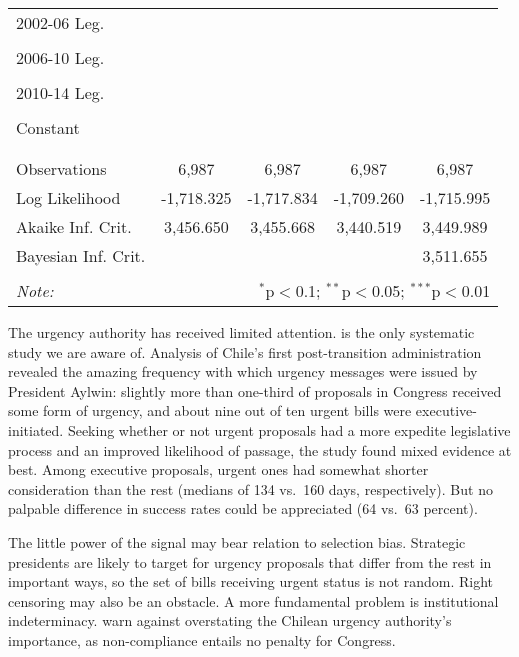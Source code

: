 \begin{table}
\begin{tabular}{@{\extracolsep{0pt}}lD{.}{.}{-3} D{.}{.}{-3} D{.}{.}{-3} D{.}{.}{-3} }
 2002-06 Leg.              &  \\ 
                           &  \\ 
 2006-10 Leg.              &   \\ 
                           &  \\ 
 2010-14 Leg.              &   \\ 
                           &  \\ 
 Constant                  &}      \\ 
                           &    \\ 
\hline \\[-1.8ex] 
Observations & \multicolumn{1}{c}{6,987} & \multicolumn{1}{c}{6,987} & \multicolumn{1}{c}{6,987} & \multicolumn{1}{c}{6,987} \\ 
Log Likelihood & \multicolumn{1}{c}{-1,718.325} & \multicolumn{1}{c}{-1,717.834} & \multicolumn{1}{c}{-1,709.260} & \multicolumn{1}{c}{-1,715.995} \\ 
Akaike Inf. Crit. & \multicolumn{1}{c}{3,456.650} & \multicolumn{1}{c}{3,455.668} & \multicolumn{1}{c}{3,440.519} & \multicolumn{1}{c}{3,449.989} \\ 
Bayesian Inf. Crit. &  &  &  & \multicolumn{1}{c}{3,511.655} \\ 
\hline 
\hline \\[-1.8ex] 
\textit{Note:}  & \multicolumn{4}{r}{$^{*}$p$<$0.1; $^{**}$p$<$0.05; $^{***}$p$<$0.01} \\ 
\end{tabular} 
\end{table} 



The urgency authority has received limited attention. \citet{siavelis.2002} is the only systematic study we are aware of. Analysis of Chile's first post-transition administration revealed the amazing frequency with which urgency messages were issued by President Aylwin: slightly more than one-third of proposals in Congress received some form of urgency, and about nine out of ten urgent bills were executive-initiated. Seeking whether or not urgent proposals had a more expedite legislative process and an improved likelihood of passage, the study found mixed evidence at best. Among executive proposals, urgent ones had somewhat shorter consideration than the rest (medians of 134 vs.\ 160 days, respectively). But no palpable difference in success rates could be appreciated (64 vs.\ 63 percent). 

The little power of the signal may bear relation to selection bias. Strategic presidents are likely to target for urgency proposals that differ from the rest in important ways, so the set of bills receiving urgent status is not random. Right censoring may also be an obstacle. A more fundamental problem is institutional indeterminacy. \citet{berrios.gamboa.fiscChile.2006} warn against overstating the Chilean urgency authority's importance, as non-compliance entails no penalty for Congress. %

